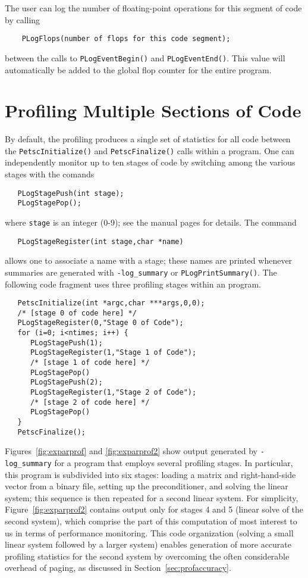 {The user can log the number of floating-point operations 
for this segment of code by calling 
\begin{verbatim}
    PLogFlops(number of flops for this code segment);
\end{verbatim}
between the calls to {\tt PLogEventBegin()} and {\tt PLogEventEnd()}.
This value will automatically be added to the global flop counter for the
entire program.

\section{Profiling Multiple Sections of Code}
\label{sec:profstages}

By default, the profiling produces a single set of statistics for all
code between the {\tt PetscInitialize()} and {\tt PetscFinalize()}
calls within a program.  One can independently monitor up to ten
stages of code by switching among the various stages with the comands
 
\begin{verbatim}
   PLogStagePush(int stage);
   PLogStagePop();
\end{verbatim}
where {\tt stage} is an integer (0-9); see the manual pages for details.
The command  
\begin{verbatim}
   PLogStageRegister(int stage,char *name)
\end{verbatim}
allows one to associate a name with a stage; these names are printed whenever
summaries are generated with {\tt -log\_summary} or {\tt PLogPrintSummary()}.
The following code fragment uses three profiling stages within an program.

\begin{verbatim}
   PetscInitialize(int *argc,char ***args,0,0);
   /* [stage 0 of code here] */
   PLogStageRegister(0,"Stage 0 of Code");
   for (i=0; i<ntimes; i++) {
      PLogStagePush(1);
      PLogStageRegister(1,"Stage 1 of Code");
      /* [stage 1 of code here] */
      PLogStagePop()
      PLogStagePush(2);
      PLogStageRegister(1,"Stage 2 of Code");
      /* [stage 2 of code here] */
      PLogStagePop()
   }
   PetscFinalize();
\end{verbatim}

Figures~\ref{fig:exparprof} and \ref{fig:exparprof2} show output
generated by {\tt -log\_summary} for a program that employs
several profiling stages.  In particular, this program is
subdivided into six stages: loading a matrix and right-hand-side
vector from a binary file, setting up the preconditioner, and solving
the linear system; this sequence is then repeated for a second linear
system.  For simplicity, Figure~\ref{fig:exparprof2} contains output
only for stages 4 and 5 (linear solve of the second system), which comprise
the part of this computation of most interest to us in terms of
performance monitoring.  This code organization (solving a small
linear system followed by a larger system) enables generation of more
accurate profiling statistics for the second system by overcoming the
often considerable overhead of paging, as discussed in
Section~\ref{sec:profaccuracy}.

}
